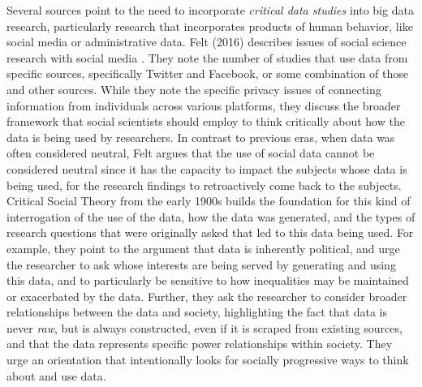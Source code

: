 \documentclass[sigconf]{acmart}
\begin{document}
Several sources point to the need to incorporate {\em critical data studies} into big data research, particularly research that incorporates products of human behavior, like social media or administrative data.  Felt (2016) describes issues of social science research with social media \cite{felt16}.  They note the number of studies that use data from specific sources, specifically Twitter and Facebook, or some combination of those and other sources.  While they note the specific privacy issues of connecting information from individuals across various platforms, they discuss the broader framework that social scientists should employ to think critically about how the data is being used by researchers.  In contrast to previous eras, when data was often considered neutral, Felt argues that the use of social data cannot be considered neutral since it has the capacity to impact the subjects whose data is being used, for the research findings to retroactively come back to the subjects.  Critical Social Theory from the early 1900s builds the foundation for this kind of interrogation of the use of the data, how the data was generated, and the types of research questions that were originally asked that led to this data being used.   For example, they point to the argument that data is inherently political, and urge the researcher to ask whose interests are being served by generating and using this data, and to particularly be sensitive to how inequalities may be maintained or exacerbated by the data.  Further, they ask the researcher to consider broader relationships between the data and society, highlighting the fact that data is never {\em raw}, but is always constructed, even if it is scraped from existing sources, and that the data represents specific power relationships within society.  They urge an orientation that intentionally looks for socially progressive ways to think about and use data.
\end{document}
